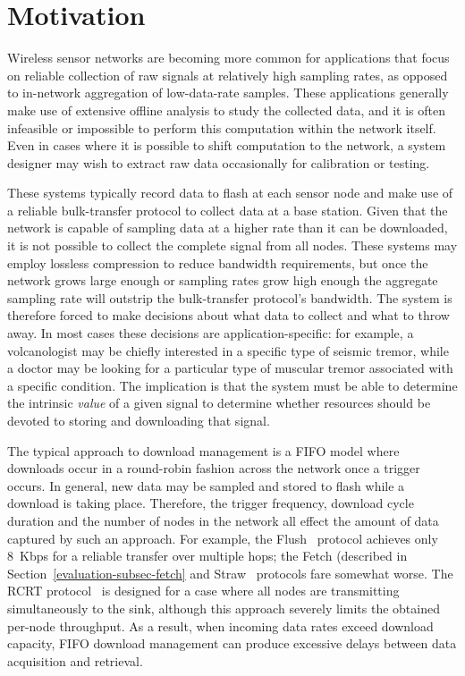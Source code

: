 \section{Motivation}
\label{lance-sec-motivation}

Wireless sensor networks are becoming more common for applications that focus
on reliable collection of raw signals at relatively high sampling rates, as
opposed to in-network aggregation of low-data-rate samples. These
applications generally make use of extensive offline analysis to study the
collected data, and it is often infeasible or impossible to perform this
computation within the network itself. Even in cases where it is possible to
shift computation to the network, a system designer may wish to extract raw
data occasionally for calibration or testing.

These systems typically record data to flash at each sensor node and make use
of a reliable bulk-transfer protocol to collect data at a base station. Given
that the network is capable of sampling data at a higher rate than it can be
downloaded, it is not possible to collect the complete signal from all nodes.
These systems may employ lossless compression to reduce bandwidth
requirements, but once the network grows large enough or sampling rates grow
high enough the aggregate sampling rate will outstrip the bulk-transfer
protocol's bandwidth. The system is therefore forced to make decisions about
what data to collect and what to throw away. In most cases these decisions
are application-specific: for example, a volcanologist may be chiefly
interested in a specific type of seismic tremor, while a doctor may be
looking for a particular type of muscular tremor associated with a specific
condition. The implication is that the system must be able to determine the
intrinsic \textit{value} of a given signal to determine whether resources
should be devoted to storing and downloading that signal.

The typical approach to download management is a FIFO model where downloads
occur in a round-robin fashion across the network once a trigger occurs. In
general, new data may be sampled and stored to flash while a download is
taking place. Therefore, the trigger frequency, download cycle duration and
the number of nodes in the network all effect the amount of data captured by
such an approach. For example, the Flush~\cite{flush-sensys07} protocol
achieves only 8~Kbps for a reliable transfer over multiple hops; the Fetch
(described in Section~\ref{evaluation-subsec-fetch} and
Straw~\cite{ggb-ipsn07} protocols fare somewhat worse. The RCRT
protocol~\cite{rcrt-sensys07} is designed for a case where all nodes are
transmitting simultaneously to the sink, although this approach severely
limits the obtained per-node throughput. As a result, when incoming data
rates exceed download capacity, FIFO download management can produce
excessive delays between data acquisition and retrieval.

